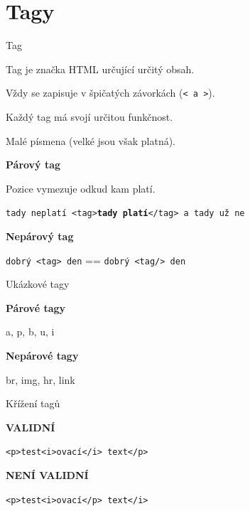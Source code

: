 \documentclass[aspectratio=169]{beamer}
\begin{document}
\section{Tagy}
\begin{frame}{Tag}
    \begin{cardTiny}
        Tag je značka HTML určující určitý obsah.

        Vždy se zapisuje v špičatých závorkách (\texttt{< a >}).

        Každý tag má svojí určitou funkčnost.

        Malé písmena (velké jsou však platná).
    \end{cardTiny}
    \begin{cardTiny}
        \begin{center}
        \textbf{Párový tag}

        Pozice vymezuje odkud kam platí.

        \texttt{tady neplatí <tag>\textbf{tady platí}</tag> a tady už ne}
        \end{center}
    \end{cardTiny}
    \begin{cardTiny}
        \begin{center}
        \textbf{Nepárový tag}

        \texttt{dobrý <tag> den} == \texttt{dobrý <tag/> den}
        \end{center}
    \end{cardTiny}
\end{frame}

\begin{frame}{Ukázkové tagy}
    \begin{cardTiny}
        \begin{center}
        \textbf{Párové tagy}

        a, p, b, u, i
        \end{center}
    \end{cardTiny}
    \begin{cardTiny}
        \begin{center}
        \textbf{Nepárové tagy}

        br, img, hr, link
        \end{center}
    \end{cardTiny}
\end{frame}

\begin{frame}{Křížení tagů}
    \begin{cardTiny}
        \begin{center}
        \textbf{VALIDNÍ}

        \texttt{<p>test<i>ovací</i> text</p>}
        \end{center}
    \end{cardTiny}
    \begin{cardTiny}
        \begin{center}
        \textbf{NENÍ VALIDNÍ}

        \texttt{<p>test<i>ovací</p> text</i>}
        \end{center}
    \end{cardTiny}
\end{frame}
\end{document}
